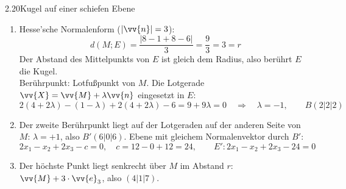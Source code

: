 \begin{loesung}{2.20}{Kugel auf einer schiefen Ebene}
\begin{enumerate}[label=\alph*)]
  \item Hesse'sche Normalenform ($|\vv{n}| = 3$):
  \[d(M;E) = \dfrac{|8-1+8-6|}{3} = \dfrac{9}{3} = 3 = r\]
  Der Abstand des Mittelpunkts von $E$ ist gleich dem Radius, also berührt $E$ die Kugel.\\
  Berührpunkt: Lotfußpunkt von $M$. Die Lotgerade $\vv{X} = \vv{M}+\lambda\vv{n}$ eingesetzt in $E$:
  \[2(4+2\lambda)-(1-\lambda)+2(4+2\lambda)-6 = 9+9\lambda = 0\quad\Longrightarrow\quad\lambda = -1,\qquad B(2|2|2)\]
  \item Der zweite Berührpunkt liegt auf der Lotgeraden auf der anderen Seite von $M$: $\lambda = +1$, also $B'(6|0|6)$. Ebene mit gleichem Normalenvektor durch $B'$:
  \[2x_1-x_2+2x_3-c = 0,\quad c = 12-0+12 = 24,\qquad E': 2x_1-x_2+2x_3-24 = 0\]
  \item Der höchste Punkt liegt senkrecht über $M$ im Abstand $r$: $\vv{M}+3\cdot\vv{e}_3$, also $(4|1|7)$.
\end{enumerate}
\end{loesung}

